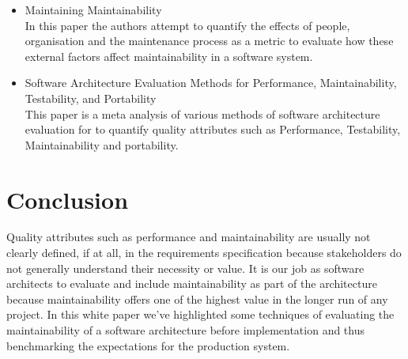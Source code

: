 \documentclass[15pt]{article}
\begin{document}
\begin{itemize}
\item Maintaining Maintainability \cite{ramage_maintaining_1998}\\
In this paper the authors attempt to quantify the effects of people, organisation and the maintenance process as a metric to evaluate how these external factors affect maintainability in a software system.

\item Software Architecture Evaluation Methods for Performance, Maintainability, Testability, and Portability \cite{mattsson_software_2006}\\
This paper is a meta analysis of various methods of software architecture evaluation for to quantify quality attributes such as Performance, Testability, Maintainability and portability.


\end{itemize}

\section{Conclusion}
Quality attributes such as performance and maintainability are usually not clearly defined, if at all, in the requirements specification because stakeholders do not generally understand their necessity or value. It is our job as software architects to evaluate and include maintainability as part of the architecture because maintainability offers one of the highest value in the longer run of any project. In this white paper we've highlighted some techniques of evaluating the maintainability of a software architecture before implementation and thus benchmarking the expectations for the production system.


\newpage


\end{document}
